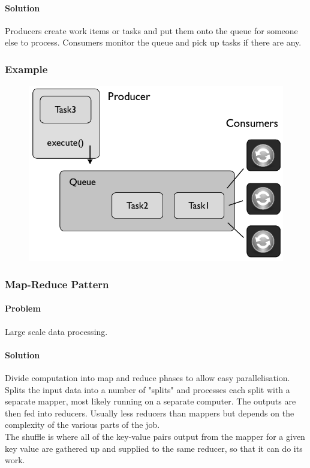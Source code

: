 \documentclass[twocolumn,english]{article}
\begin{document}
\paragraph{Solution}
Producers create work items or tasks and put them onto the queue for someone else to process. Consumers monitor the queue and pick up tasks if there are any. 


\subsubsection*{Example}

\begin{figure}[H]
\centering{}\includegraphics[width=0.4\columnwidth]{img/pubsub} 
\end{figure}



\subsubsection{Map-Reduce Pattern}


\paragraph{Problem}

Large scale data processing.


\paragraph{Solution}

Divide computation into map and reduce phases to allow easy parallelisation.\\
Splits the input data into a number of "splits" and processes each split with a separate mapper, most likely running on a separate computer. The outputs are then fed into reducers. Usually less reducers than mappers but depends on the complexity of the various parts of the job. \\
The shuffle is where all of the key-value pairs output from the mapper for a given key value are gathered up and supplied to the same reducer, so that it can do its work.
\end{document}

